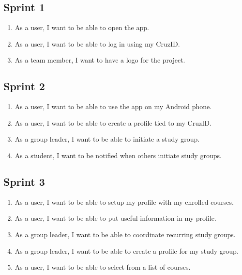\documentclass[10pt]{article}
\begin{document}
    \subsection{Sprint 1}
    \begin{enumerate}
        \item As a user, I want to be able to open the app.
        \item As a user, I want to be able to log in using my CruzID.
        \item As a team member, I want to have a logo for the project.
    \end{enumerate}

    \subsection{Sprint 2}
    \begin{enumerate}
        \item As a user, I want to be able to use the app on my Android phone.
        \item As a user, I want to be able to create a profile tied to my CruzID.
        \item As a group leader, I want to be able to initiate a study group.
        \item As a student, I want to be notified when others initiate study groups.
    \end{enumerate}
    
    \subsection{Sprint 3}
    \begin{enumerate}
        \item As a user, I want to be able to setup my profile with my enrolled courses.
        \item As a user, I want to be able to put useful information in my profile.
        \item As a group leader, I want to be able to coordinate recurring study groups.
        \item As a group leader, I want to be able to create a profile for my study group.
        \item As a user, I want to be able to select from a list of courses.
    \end{enumerate}
\end{document}

